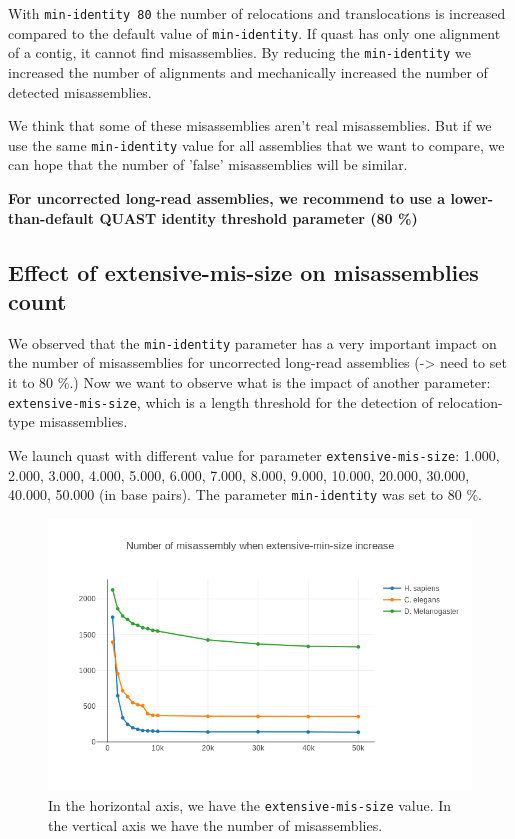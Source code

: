 \documentclass[./main.tex]{subfiles}
\begin{document}
With \texttt{min-identity\ 80} the number of relocations and
translocations is increased compared to the default value of
\texttt{min-identity}. If quast has only one alignment of a contig, it
cannot find misassemblies. By reducing the \texttt{min-identity} we
increased the number of alignments and mechanically increased the number
of detected misassemblies.

We think that some of these misassemblies aren't real misassemblies. But
if we use the same \texttt{min-identity} value for all assemblies that
we want to compare, we can hope that the number of 'false' misassemblies
will be similar.

\textbf{For uncorrected long-read assemblies, we recommend to use a
lower-than-default QUAST identity threshold parameter (80 \%)}

\subsection{Effect of extensive-mis-size on misassemblies count}

We observed that the \texttt{min-identity} parameter has a very
important impact on the number of misassemblies for uncorrected
long-read assemblies (-\textgreater{} need to set it to 80 \%.) Now we
want to observe what is the impact of another parameter:
\texttt{extensive-mis-size}, which is a length threshold for the
detection of relocation-type misassemblies.

We launch quast with different value for parameter
\texttt{extensive-mis-size}: 1.000, 2.000, 3.000, 4.000, 5.000, 6.000,
7.000, 8.000, 9.000, 10.000, 20.000, 30.000, 40.000, 50.000 (in base
pairs). The parameter \texttt{min-identity} was set to 80 \%.

\begin{figure}
    \centering
    \includegraphics[width=\textwidth]{paper/misassemblies-in-noisy-assemblies/misassemblies_x_extensive_mis_size.png}
    \caption{In the horizontal axis, we have the \texttt{extensive-mis-size} value.
In the vertical axis we have the number of misassemblies.}
    \label{misassemblies_x_all}
\end{figure}
\end{document}
